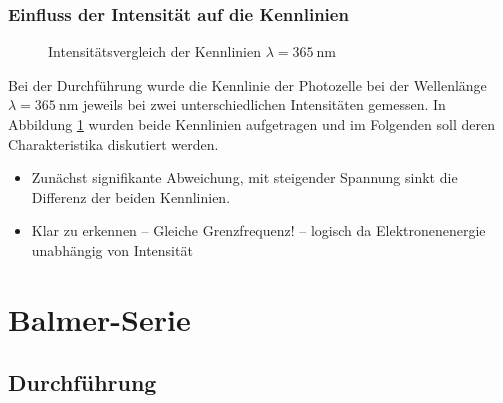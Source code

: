 \documentclass[11pt, a4paper]{article}
\numberwithin{equation}{section}
\begin{document}
\subsubsection{Einfluss der Intensität auf die Kennlinien}
\begin{figure}[h]
	\centering
	
	\caption{Intensitätsvergleich der Kennlinien $\lambda = \SI{365}{\nano\metre}$}
	\label{fig:kennlinie_intensitaet}
\end{figure}
Bei der Durchführung wurde die Kennlinie der Photozelle bei der Wellenlänge $\lambda = \SI{365}{\nano\metre}$ jeweils bei zwei unterschiedlichen Intensitäten gemessen.
In Abbildung \ref{fig:kennlinie_intensitaet} wurden beide Kennlinien aufgetragen und im Folgenden soll deren Charakteristika diskutiert werden.
\begin{itemize}
	\item Zunächst signifikante Abweichung, mit steigender Spannung sinkt die Differenz der beiden Kennlinien.
	\item Klar zu erkennen -- Gleiche Grenzfrequenz! -- logisch da Elektronenenergie unabhängig von Intensität
\end{itemize}

\clearpage
\section{Balmer-Serie}

\subsection{Durchführung}
\end{document}
